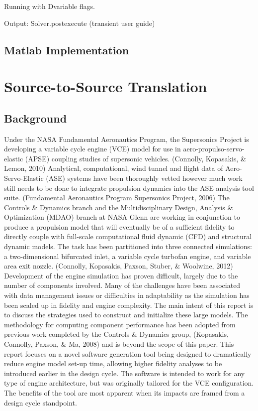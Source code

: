\documentclass[heading.tex]{subfiles}
\begin{document}
Running with Dvariable flags.

Output: Solver.postexecute (transient user guide)

\subsection{Matlab Implementation}

\section{Source-to-Source Translation}
\subsection{Background}
Under the NASA Fundamental Aeronautics Program, the Supersonics Project is developing a variable cycle engine (VCE) model for use in aero-propulso-servo-elastic (APSE) coupling studies of supersonic vehicles. (Connolly, Kopasakis, \& Lemon, 2010) Analytical, computational, wind tunnel and flight data of Aero-Servo-Elastic (ASE) systems have been thoroughly vetted however much work still needs to be done to integrate propulsion dynamics into the ASE analysis tool suite. (Fundamental Aeronautics Program Supersonics Project, 2006)
The Controls \& Dynamics branch and the Multidisciplinary Design, Analysis \& Optimization (MDAO) branch at NASA Glenn are working in conjunction to produce a propulsion model that will eventually be of a sufficient fidelity to directly couple with full-scale computational fluid dynamic (CFD) and structural dynamic models. The task has been partitioned into three connected simulations: a two-dimensional bifurcated inlet, a variable cycle turbofan engine, and variable area exit nozzle. (Connolly, Kopasakis, Paxson, Stuber, \& Woolwine, 2012) 
Development of the engine simulation has proven difficult, largely due to the number of components involved. Many of the challenges have been associated with data management issues or difficulties in adaptability as the simulation has been scaled up in fidelity and engine complexity. The main intent of this report is to discuss the strategies used to construct and initialize these large models.  The methodology for computing component performance has been adopted from previous work completed by the Controls \& Dynamics group, (Kopasakis, Connolly, Paxson, \& Ma, 2008) and is beyond the scope of this paper.
This report focuses on a novel software generation tool being designed to dramatically reduce engine model set-up time, allowing higher fidelity analyses to be introduced earlier in the design cycle. The software is intended to work for any type of engine architecture, but was originally tailored for the VCE configuration. The benefits of the tool are most apparent when its impacts are framed from a design cycle standpoint.
\end{document}
